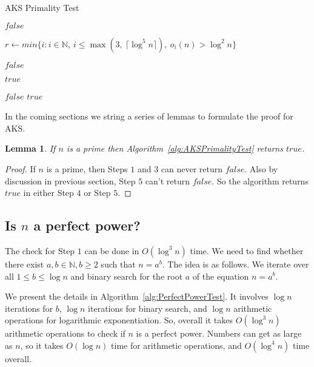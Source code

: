 \documentclass[11pt]{article}
\newtheorem{lemma}[theorem]{Lemma}
\begin{document}
\begin{algorithm}
\caption{AKS Primality Test}
\label{alg:AKSPrimalityTest}
\begin{algorithmic}

	\State \Return $false$  
\EndIf

\State $r \gets min \{i: i \in \mathbb{N},\ i \leq \max(3,\ \lceil \log^5 n \rceil),\ o_i(n) > \log^2 n \}$ 

		\State \Return $false$  
	\EndIf
\EndFor

	\Return $true$  
\EndIf

		\State \Return $false$  
	\EndIf
\EndFor
\State \Return $true$ 
\EndProcedure
\end{algorithmic}
\end{algorithm}


In the coming sections we string a series of lemmas to formulate the proof for AKS.

\begin{lemma}
\label{lemma:AKSLemma1}
If $n$ is a prime then Algorithm~\ref{alg:AKSPrimalityTest} returns $true$.
\end{lemma}
 
\begin{proof}
If $n$ is a prime, then Steps $1$ and $3$ can never return $false$. Also by discussion in previous section, Step $5$ can't return $false$. So the algorithm returns $true$ in either Step $4$ or Step $5$.
\end{proof}

\subsection{Is $n$ a perfect power?}
The check for Step $1$ can be done in $O(\log^3 n)$ time. We need to find whether there exist $a, b \in \mathbb{N}, b \geq 2$ such that $n = a^b$. The idea is as follows. We iterate over all $1 \leq b \leq \log n$ and binary search for the root $a$ of the equation $n = a^b$. 

We present the details in Algorithm~\ref{alg:PerfectPowerTest}. It involves $\log n$ iterations for $b$, $\log n$ iterations for binary search, and $\log n$ arithmetic operations for logarithmic exponentiation. So, overall it takes $O(\log^3 n)$ arithmetic operations to check if $n$ is a perfect power. Numbers can get as large as $n$, so it takes $O(\log n)$ time for arithmetic operations, and $O(\log^4 n)$ time overall.
\end{document}

